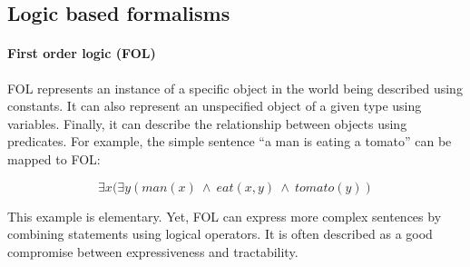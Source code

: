 



\subsection{Logic based formalisms}






\paragraph{First order logic (FOL)} FOL \parencite{smullyan2012first} represents an instance of a specific object in the world being described using constants. It can also represent an unspecified object of a given type using variables. Finally, it can describe the relationship between objects using predicates. For example, the simple sentence “a man is eating a tomato” can be mapped to FOL:

\begin{equation}
    \exists x (\exists y (man(x) \ \land \ eat(x, y) \  \land \ tomato(y))
\end{equation}

This example is elementary. Yet, FOL can express more complex sentences by combining statements using logical operators. It is often described as a good compromise between expressiveness and tractability. 

